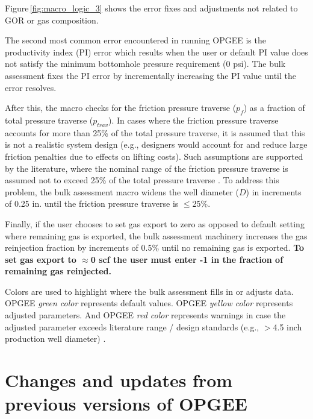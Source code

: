 \documentclass[11pt]{report}
\begin{document}
Figure\,\ref{fig:macro_logic_3} shows the error fixes and adjustments not related to GOR or gas composition. 

The second most common error encountered in running OPGEE is the productivity index (PI) error which results when the user or default PI value does not satisfy the minimum bottomhole pressure requirement (0 psi). The bulk assessment fixes the PI error by incrementally increasing the PI value until the error resolves. 

After this, the macro checks for the friction pressure traverse ($p_f$) as a fraction of total pressure traverse ($p_{trav}$). In cases where the friction pressure traverse accounts for more than 25\% of the total pressure traverse, it is assumed that this is not a realistic system design (e.g., designers would account for and reduce large friction penalties due to effects on lifting costs). Such assumptions are supported by the literature, where the nominal range of the friction pressure traverse is assumed not to exceed 25\% of the total pressure traverse \cite{Takacs2005}. To address this problem, the bulk assessment macro widens the well diameter ($D$) in increments of 0.25 in. until the friction pressure traverse is $\leq$25\%. 

Finally, if the user chooses to set gas export to zero as opposed to default setting where remaining gas is exported, the bulk assessment machinery increases the gas reinjection fraction by increments of 0.5\% until no remaining gas is exported. \textbf{To set gas export to $\approx$0 scf the user must enter -1 in the fraction of remaining gas reinjected.} \par

Colors are used to highlight where the bulk assessment fills in or adjusts data. OPGEE \textit{green color} represents default values. OPGEE \textit{yellow color} represents adjusted parameters. And OPGEE \textit{red color} represents warnings in case the adjusted parameter exceeds literature range / design standards (e.g., $>$4.5 inch production well diameter) \cite[p. 106]{Clegg2007}.





\chapter{Changes and updates from previous versions of OPGEE}
\end{document}
